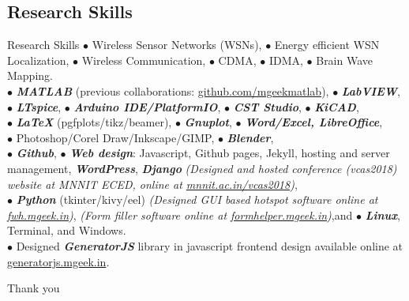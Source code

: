 \documentclass[t,hyperref={pdfpagemode=FullScreen,colorlinks=false},
xcolor={dvipsnames,svgnames,table},9pt]{beamer}
\newcommand{\cusemph}[1]{{\emph{\textbf{#1}}}}
\begin{document}
\subsection{Research Skills }
\begin{frame}[allowframebreaks]{Research Skills }{}
{\scriptsize$\bullet$} Wireless Sensor Networks (WSNs), {\scriptsize$\bullet$} Energy efficient WSN Localization, {\scriptsize$\bullet$} Wireless Communication, {\scriptsize$\bullet$} CDMA, {\scriptsize$\bullet$} IDMA, {\scriptsize$\bullet$} Brain Wave Mapping.\\
{\scriptsize$\bullet$} \cusemph{MATLAB} (previous collaborations: \href{https://github.com/mgeekmatlab}{github.com/mgeekmatlab}), {\scriptsize$\bullet$} \cusemph{LabVIEW}, {\scriptsize$\bullet$} \cusemph{LTspice}, {\scriptsize$\bullet$} \cusemph{Arduino IDE/PlatformIO}, {\scriptsize$\bullet$} \cusemph{CST Studio}, {\scriptsize$\bullet$} \cusemph{KiCAD},\\ 
{\scriptsize$\bullet$} \cusemph{LaTeX} (pgfplots/tikz/beamer), {\scriptsize$\bullet$} \cusemph{Gnuplot}, {\scriptsize$\bullet$} \cusemph{Word/Excel, LibreOffice},\\
{\scriptsize$\bullet$} Photoshop/Corel Draw/Inkscape/GIMP, {\scriptsize$\bullet$} \cusemph{Blender}, \\
{\scriptsize$\bullet$} \cusemph{Github}, {\scriptsize$\bullet$} \cusemph{Web design}: Javascript, Github pages, Jekyll, hosting and server management, \cusemph{WordPress}, \cusemph{Django} \emph{(Designed and hosted conference (vcas2018) website at MNNIT ECED, online at \href{http://mnnit.ac.in/vcas2018}{mnnit.ac.in/vcas2018})}, \\
{\scriptsize$\bullet$} \cusemph{Python} (tkinter/kivy/eel) \emph{(Designed GUI based hotspot software online at \href{https://fwh.mgeek.in}{fwh.mgeek.in})}, \emph{(Form filler software online at \href{https://formhelper.mgeek.in}{formhelper.mgeek.in})},and {\scriptsize$\bullet$} \cusemph{Linux}, Terminal, and Windows.\\ {\scriptsize$\bullet$} Designed \cusemph{GeneratorJS} library in javascript frontend design available online at \href{https://generatorjs.mgeek.in}{generatorjs.mgeek.in}.\\

\end{frame}


\begin{frame}[plain]{}{}
\begin{center}
\vfill
\Huge{
Thank you
}
\vfill
\end{center}
\end{frame}
\nocite{*}
\end{document}
